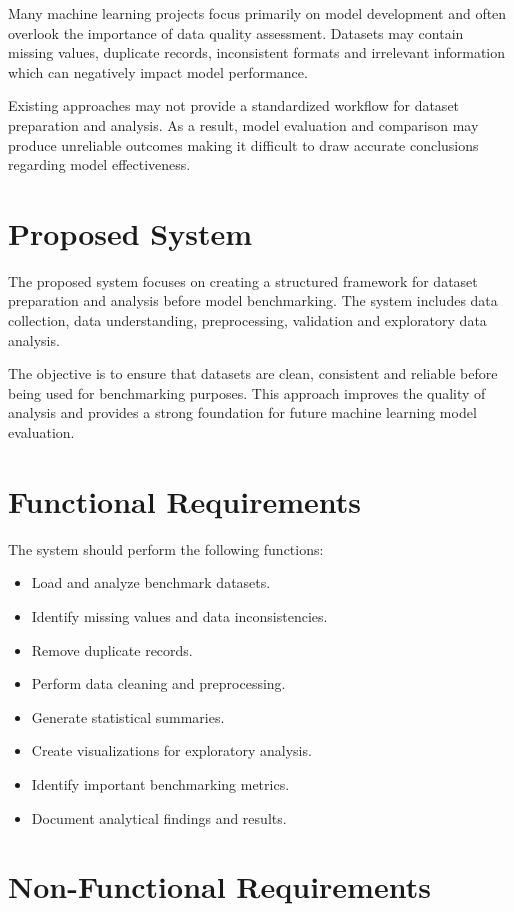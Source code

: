 \documentclass[12pt,a4paper]{report}
\begin{document}
Many machine learning projects focus primarily on model development and often overlook the importance of data quality assessment. Datasets may contain missing values, duplicate records, inconsistent formats and irrelevant information which can negatively impact model performance.

Existing approaches may not provide a standardized workflow for dataset preparation and analysis. As a result, model evaluation and comparison may produce unreliable outcomes making it difficult to draw accurate conclusions regarding model effectiveness.

\section{Proposed System}

The proposed system focuses on creating a structured framework for dataset preparation and analysis before model benchmarking. The system includes data collection, data understanding, preprocessing, validation and exploratory data analysis.

The objective is to ensure that datasets are clean, consistent and reliable before being used for benchmarking purposes. This approach improves the quality of analysis and provides a strong foundation for future machine learning model evaluation.

\section{Functional Requirements}

The system should perform the following functions:

\begin{itemize}
\item Load and analyze benchmark datasets.
\item Identify missing values and data inconsistencies.
\item Remove duplicate records.
\item Perform data cleaning and preprocessing.
\item Generate statistical summaries.
\item Create visualizations for exploratory analysis.
\item Identify important benchmarking metrics.
\item Document analytical findings and results.
\end{itemize}

\section{Non-Functional Requirements}
\end{document}
